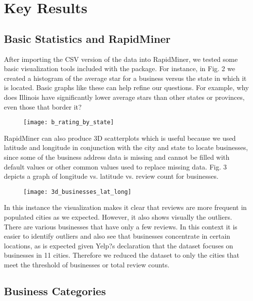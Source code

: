 \section{Key Results}

\subsection{Basic Statistics and RapidMiner}

\quad After importing the CSV version of the data into RapidMiner, we tested some basic visualization tools included with the package. For instance, in Fig. 2 we created a histogram of the average star for a business versus the state in which it is located. Basic graphs like these can help refine our questions. For example, why does Illinois have significantly lower average stars than other states or provinces, even those that border it?

\begin{figure}[h]
\texttt{[image: b\_rating\_by\_state]}
\end{figure}

\quad RapidMiner can also produce 3D scatterplots which is useful because we used latitude and longitude in conjunction with the city and state to locate businesses, since some of the business address data is missing and cannot be filled with default values or other common values used to replace missing data. Fig. 3 depicts a graph of longitude vs. latitude vs. review count for businesses.

\begin{figure}[!h]
\texttt{[image: 3d\_businesses\_lat\_long]}
\end{figure}

\quad In this instance the visualization makes it clear that reviews are more frequent in populated cities as we expected. However, it also shows visually the outliers. There are various businesses that have only a few reviews. In this context it is easier to identify outliers and also see that businesses concentrate in certain locations, as is expected given Yelp?s declaration that the dataset focuses on businesses in 11 cities. Therefore we reduced the dataset to only the cities that meet the threshold of businesses or total review counts.

\subsection{Business Categories}

